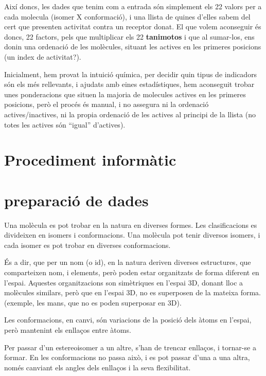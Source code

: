 \documentclass[titlepage,a4paper,12pt]{book}
\begin{document}
Així doncs, les dades que tenim com a entrada són simplement els 22 valors per a
cada molecula (isomer X conformació), i una llista de quines d'elles sabem del
cert que presenten activitat contra un receptor donat.  El que volem aconseguir
és doncs, 22 factors, pels que multiplicar els 22 \textbf{tanimotos} i que al
sumar-los, ens donin una ordenació de les molècules, situant les actives en
les primeres posicions (un index de activitat?).


Inicialment, hem provat la intuició química, per decidir quin tipus de
indicadors són els més rellevants, i ajudats amb eines estadístiques, hem
aconseguit trobar unes ponderacions que situen la majoria de molecules actives
en les primeres posicions, però el procés és manual, i no assegura ni la
ordenació actives/inactives, ni la propia ordenació de les actives al principi
de la llista (no totes les actives són ``igual'' d'actives).


\section{Procediment informàtic} %
\label{sec:Procediment informatic}


\section{preparació de dades} %
\label{sec:preparacio de dades}
Una molècula es pot trobar en la natura en diverses formes.  Les clasificacions es divideixen en
isomers i conformacions.  Una molècula pot tenir diversos isomers, i cada isomer es pot trobar en  
diverses conformacions.

És a dir, que per un nom (o id), en la natura deriven diverses estructures, que comparteixen nom, i
elements, però poden estar organitzats de forma diferent en l'espai. Aquestes organitzacions son
simètriques en l'espai 3D, donant lloc a molècules similars, però que en l'espai 3D, no es superposen de la
mateixa forma. (exemple, les mans, que no es poden superposar en 3D).

Les conformacions, en canvi, són variacions de la posició dels àtoms en l'espai, però mantenint els
enllaços entre àtoms.

Per passar d'un estereoisomer a un altre, s'han de trencar enllaços, i tornar-se a formar.  En les
conformacions no passa això, i es pot passar d'una a una altra, només canviant els angles dels
enllaços i la seva flexibilitat. 
\end{document}
